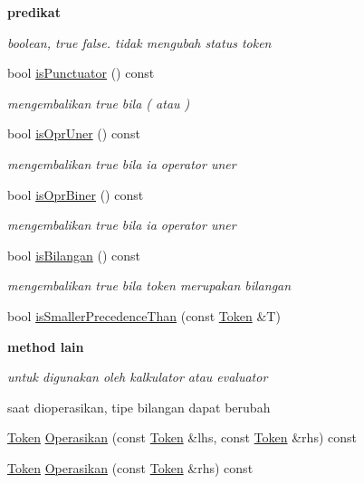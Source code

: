 \begin{Indent}{\bf predikat}\par
{\em boolean, true false. tidak mengubah status token }\begin{DoxyCompactItemize}
\item 
bool \hyperlink{class_token_a8a15bf44ca4622994dfce8e43f78d76c}{is\-Punctuator} () const 
\begin{DoxyCompactList}\small\item\em mengembalikan true bila ( atau ) \end{DoxyCompactList}\item 
bool \hyperlink{class_token_a08c5aa25effd9d4b7dd5e2dda0f72058}{is\-Opr\-Uner} () const 
\begin{DoxyCompactList}\small\item\em mengembalikan true bila ia operator uner \end{DoxyCompactList}\item 
bool \hyperlink{class_token_aa601738aa08b5ad132d038b0c806fab9}{is\-Opr\-Biner} () const 
\begin{DoxyCompactList}\small\item\em mengembalikan true bila ia operator uner \end{DoxyCompactList}\item 
bool \hyperlink{class_token_a3db1e9f877edcdc5f12fdea1496e7526}{is\-Bilangan} () const 
\begin{DoxyCompactList}\small\item\em mengembalikan true bila token merupakan bilangan \end{DoxyCompactList}\item 
bool \hyperlink{class_token_a40f66005d5df3d37c679258f2c9ab796}{is\-Smaller\-Precedence\-Than} (const \hyperlink{class_token}{Token} \&T)
\end{DoxyCompactItemize}
\end{Indent}
\begin{Indent}{\bf method lain}\par
{\em untuk digunakan oleh kalkulator atau evaluator\par
saat dioperasikan, tipe bilangan dapat berubah\par
}\begin{DoxyCompactItemize}
\item 
\hyperlink{class_token}{Token} \hyperlink{class_token_a7e04e49806d087cbc8062bafe848e471}{Operasikan} (const \hyperlink{class_token}{Token} \&lhs, const \hyperlink{class_token}{Token} \&rhs) const 
\item 
\hyperlink{class_token}{Token} \hyperlink{class_token_ace8d206103c7cd6bda80c9f2beea462b}{Operasikan} (const \hyperlink{class_token}{Token} \&rhs) const 
\end{DoxyCompactItemize}
\end{Indent}


